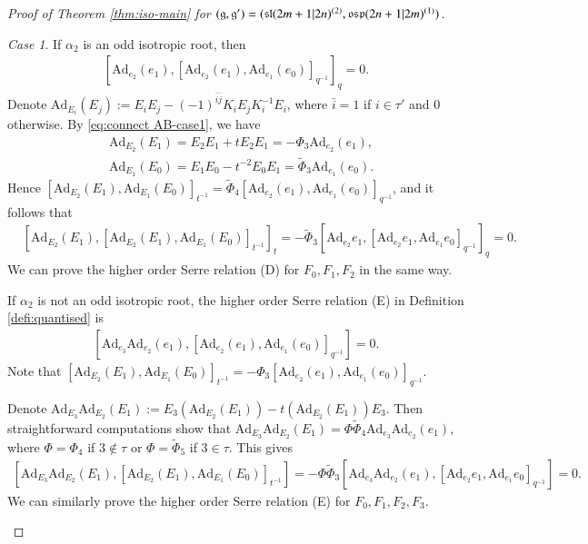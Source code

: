 \documentclass[12pt]{amsart}
\theoremstyle{definition}
\theoremstyle{remark}
\numberwithin{equation}{section}
\newtheorem{case}{Case}
\begin{document}
\begin{proof}[Proof of Theorem \ref{thm:iso-main} for $({{\mathfrak g}}, {{\mathfrak g}}')=({{\rm\mathfrak{sl}}}(2m+1|2n)^{(2)}, {{\rm\mathfrak{osp}}}(2n+1|2m)^{(1)})$]
\begin{case}
If $\alpha_2$ is an odd isotropic root, then
\[
\begin{aligned}
\left[{{\mbox{Ad}}}_{e_{2}}(e_{1}), \left[{{\mbox{Ad}}}_{e_{2}}(e_1) , {{\mbox{Ad}}}_{e_1}(e_{0})\right]_{q^{-1}}\right]_{q}=0.
\end{aligned}\]
Denote ${{\mbox{Ad}}}_{E_i}(E_j):=E_iE_j-(-1)^{\bar{i}\bar{j}}K_iE_jK_i^{-1}E_i$, where $\bar{i}=1$ if $i\in\tau'$ and $0$ otherwise. By \eqref{eq:connect AB-case1}, we have
\[\begin{aligned}
&{{\mbox{Ad}}}_{E_2}(E_1)=E_2E_1+tE_2E_1=-\Phi_3{{\mbox{Ad}}}_{e_2}(e_1),\\
&{{\mbox{Ad}}}_{E_1}(E_0)=E_1E_0-t^{-2}E_0E_1=\tilde{\Phi}_3{{\mbox{Ad}}}_{e_1}(e_0).
\end{aligned}\]
Hence $\left[{{\mbox{Ad}}}_{E_{2}}(E_1), {{\mbox{Ad}}}_{E_1}(E_{0})\right]_{t^{-1}}=\tilde{\Phi}_4\left[{{\mbox{Ad}}}_{e_{2}}(e_1), {{\mbox{Ad}}}_{e_1}(e_{0})\right]_{q^{-1}}$, and it follows that
\[\begin{aligned}
&\left[{{\mbox{Ad}}}_{E_{2}}(E_{1}), \left[{{\mbox{Ad}}}_{E_{2}}(E_1) , {{\mbox{Ad}}}_{E_1}(E_{0})\right]_{t^{-1}}\right]_t=-\tilde{\Phi}_3\left[{{\mbox{Ad}}}_{e_{2}}e_{1}, \left[{{\mbox{Ad}}}_{e_{2}}e_1 , {{\mbox{Ad}}}_{e_1}e_{0}\right]_{q^{-1}}\right]_{q}=0.
\end{aligned}\]
We can prove the higher order Serre relation (D) for $F_0,F_1,F_2$
in the same way.

If $\alpha_2$ is not an odd isotropic root, the higher order Serre relation (E) in Definition \ref{defi:quantised} is
\[\begin{aligned}
\left[{{\mbox{Ad}}}_{e_3}{{\mbox{Ad}}}_{e_2}(e_1),\left[{{\mbox{Ad}}}_{e_{2}}(e_1), {{\mbox{Ad}}}_{e_1}(e_{0})
\right]_{q^{-1}}\right]=0.
\end{aligned}\]
Note that
$
\left[{{\mbox{Ad}}}_{E_{2}}(E_1), {{\mbox{Ad}}}_{E_1}(E_{0})
\right]_{t^{-1}}=-\Phi_3\left[{{\mbox{Ad}}}_{e_{2}}(e_1), {{\mbox{Ad}}}_{e_1}(e_{0})
\right]_{q^{-1}}.
$

Denote ${{\mbox{Ad}}}_{E_3}{{\mbox{Ad}}}_{E_2}(E_1):=E_3({{\mbox{Ad}}}_{E_2}(E_1))-t({{\mbox{Ad}}}_{E_2}(E_1))E_3$. Then straightforward computations show that
$
{{\mbox{Ad}}}_{E_3}{{\mbox{Ad}}}_{E_2}(E_1)=\Phi\tilde{\Phi}_4{{\mbox{Ad}}}_{e_3}{{\mbox{Ad}}}_{e_2}(e_1),
$
where $\Phi=\Phi_4$ if $3\notin\tau$ or $\Phi=\tilde{\Phi}_5$ if $3\in\tau$. This gives
\[
\begin{aligned}
\left[{{\mbox{Ad}}}_{E_3}{{\mbox{Ad}}}_{E_2}(E_1),\left[{{\mbox{Ad}}}_{E_{2}}(E_1), {{\mbox{Ad}}}_{E_1}(E_{0})
\right]_{t^{-1}}\right]
=-\Phi\tilde{\Phi}_3\left[{{\mbox{Ad}}}_{e_3}{{\mbox{Ad}}}_{e_2}(e_1),\left[{{\mbox{Ad}}}_{e_{2}}e_1, {{\mbox{Ad}}}_{e_1}e_{0}
\right]_{q^{-1}}\right]=0.
\end{aligned}
\]
We can similarly prove the higher order Serre relation (E) for $F_0,F_1,F_2,F_3$.
\end{case}


\end{proof}
\end{document}
